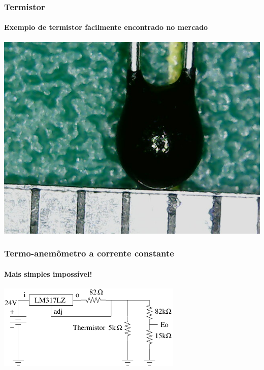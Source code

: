 \documentclass[12pt,handout]{beamer}
\begin{document}
\begin{frame}
  \frametitle{Termistor}
  \framesubtitle{Exemplo de termistor facilmente encontrado  no mercado} 
  \centering
  \includegraphics[height=0.7\textheight]{../../figures/termistor.jpg}
\end{frame}

\begin{frame}
  \frametitle{Termo-anemômetro a corrente constante}
  \framesubtitle{Mais simples impossível!}
  \centering
  \includegraphics[width=0.66\textwidth]{../../figures/cca.pdf} 
  
\end{frame}
\end{document}
